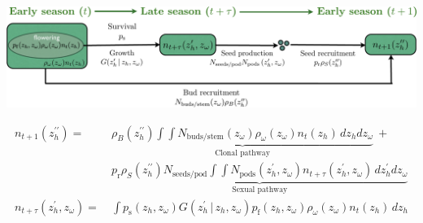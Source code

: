 \documentclass[10pt]{article}
\begin{document}
\begin{framed}

\begin{center}
\includegraphics[width=5.5in]{life-cycle-diagram.pdf}

\begin{align*}
n_{t+1}(z_{h}^{\prime\prime}) = \ & \underbrace{\rho_{B}(z_{h}^{\prime\prime})\int\int N_{\mathrm{buds/stem}}(z_{\omega})\rho_{\omega}(z_{\omega})n_{t}(z_{h})\, dz_{h}dz_{\omega}}_\text{Clonal pathway} \ + \\
  & \underbrace{p_{\mathrm{r}}\rho_{S}(z_{h}^{\prime\prime})N_{\mathrm{seeds/pod}}\int\int N_{\mathrm{pods}}\left(z_{h}^{\prime},z_{\omega}\right)n_{t+\tau}(z_{h}^{\prime},z_{\omega}) \,dz_{h}^{\prime}dz_{\omega}}_\text{Sexual pathway} \\
n_{t+\tau}(z_{h}^{\prime},z_{\omega}) = \ & \int p_{\mathrm{s}}(z_{h},z_{\omega}) G(z_{h}^{\prime}\, | \, z_{h},z_{\omega})p_{\mathrm{f}}(z_{h},z_{\omega})\rho_{\omega}(z_{\omega})n_{t}(z_{h})\, dz_{h}
\end{align*}

\end{center}

\vspace{0.35in}


\end{framed}
\end{document}
